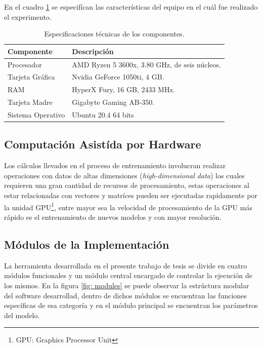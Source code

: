 En el cuadro \ref{tab:specs} se especifícan las características del equipo en el cuál fue realizado el experimento.

\begin{table}[H]
    \centering
    \caption{Especificaciones técnicas de los componentes.}
    \begin{tabular}{|l|l|}
        \hline
        \bf{Componente} & \bf{Descripción} \\
        \hline
        Procesador & AMD Ryzen 5 3600x, 3.80 GHz, de seis núcleos.\\
        \hline
        Tarjeta Gráfica & Nvidia GeForce 1050ti, 4 GB. \\
        \hline
        RAM & HyperX Fury, 16 GB, 2433 MHz. \\
        \hline
        Tarjeta Madre & Gigabyte Gaming AB-350. \\
        \hline
        Sistema Operativo & Ubuntu 20.4 64 bits \\
        \hline
    \end{tabular}
    \label{tab:specs}
\end{table}

\subsection{Computación Asistída por Hardware}
Los cálculos llevados en el proceso de entrenamiento involucran realizar operaciones con datos de altas dimensiones (\emph{high-dimensional data}) los cuales requieren una gran cantidad de recursos de procesamiento, estas operaciones al estar relacionadas con vectores y matríces pueden ser ejecutadas rapidamente por la unidad GPU\footnote{GPU: Graphics Processor Unit}, entre mayor sea la velocidad de procesamiento de la GPU más rápido es el entrenamiento de nuevos modelos y con mayor resolución.

\subsection{Módulos de la Implementación}
La herramienta desarrollada en el presente trabajo de tesis se divide en cuatro módulos funcionales y un módulo central encargado de controlar la ejecución de los mismos. En la figura \ref{fig: modules} se puede observar la estrúctura modular del software desarrollad, dentro de dichos módulos se encuentran las funciones específicas de esa categoría y en el módulo principal se encuentran los parámetros del modelo.

